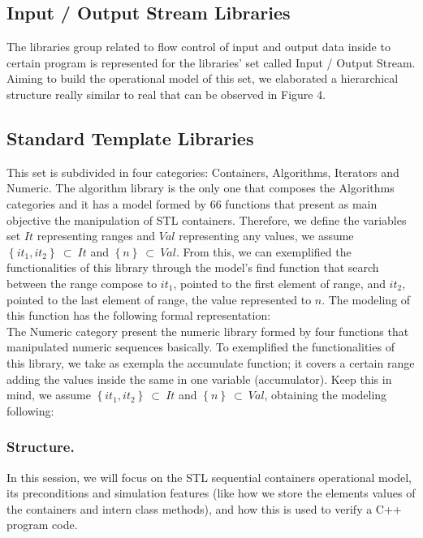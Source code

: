 \documentclass[a4paper]{llncs}
\begin{document}
\subsection{Input / Output Stream Libraries}
The libraries group related to flow control of input and output data inside to certain program is represented for the libraries' set called Input / Output Stream. Aiming to build the operational model of this set, we elaborated a hierarchical structure really similar to real that can be observed in Figure 4.
\subsection{Standard Template Libraries}

This set is subdivided in four categories: Containers, Algorithms, Iterators and Numeric. The algorithm library is the only one that composes the Algorithms categories and it has a model formed by 66 functions that present as main objective the manipulation of STL containers. Therefore, we define the variables set $It$ representing ranges and $Val$ representing any values, we assume $\left\{it_{1}, it_{2}\right\} \:\subset\:It$ and $\left\{n\right\} \:\subset\:Val$. From this, we can exemplified the functionalities of this library through the model's find function that search between the range compose to $it_{1}$, pointed to the first element of range, and $it_{2}$, pointed to the last element of range, the value represented to $n$. The modeling of this function has the following formal representation:
\\
	The Numeric category present the numeric library formed by four functions that manipulated numeric sequences basically. To exemplified the functionalities of this library, we take as exempla the accumulate function; it covers a certain range adding the values inside the same in one variable (accumulator). Keep this in mind, we assume $\left\{it_{1}, it_{2}\right\} \:\subset\:It$ and $\left\{n\right\} \:\subset\:Val$, obtaining the modeling following:

\subsubsection{Structure.}

In this session, we will focus on the STL sequential containers operational model, its preconditions and simulation features (like how we store the elements values of the containers and intern class methods), and how this is used to verify a C++ program code.
\end{document}
